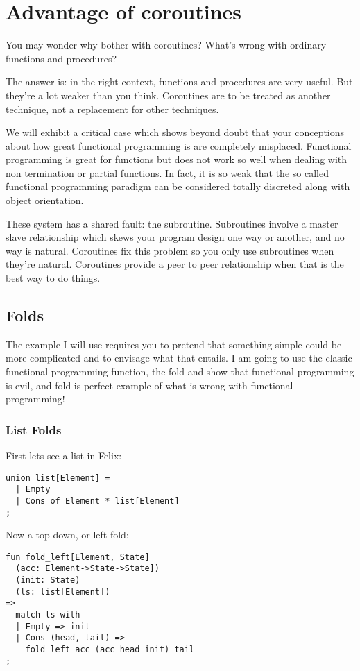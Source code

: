 \documentclass[oneside]{book}
\begin{document}
\chapter{Advantage of coroutines}
You may wonder why bother with coroutines? What's wrong with
ordinary functions and procedures?

The answer is: in the right context, functions and procedures
are very useful. But they're a lot weaker than you think.
Coroutines are to be treated as another technique, not a replacement
for other techniques.

We will exhibit a critical case which shows beyond doubt
that your conceptions about how great functional programming
is are completely misplaced. Functional programming is great for
functions but does not work so well when dealing with non termination
or partial functions. In fact, it is so weak that the so called
functional programming paradigm can be considered totally discreted
along with object orientation.

These system has a shared fault: the subroutine. Subroutines involve
a master slave relationship which skews your program design one
way or another, and no way is natural. Coroutines fix this problem
so you only use subroutines when they're natural. Coroutines provide
a peer to peer relationship when that is the best way to do things.

\section{Folds}
The example I will use requires you to pretend that something simple
could be more complicated and to envisage what that entails. 
I am going to use the classic functional programming function,
the fold and show that functional programming is evil, and fold is 
perfect example of what is wrong with functional programming!

\subsection{List Folds}
First lets see a list in Felix:

\begin{verbatim}
union list[Element] =
  | Empty 
  | Cons of Element * list[Element]
;
\end{verbatim}

Now a top down, or left fold:

\begin{verbatim}
fun fold_left[Element, State] 
  (acc: Element->State->State])
  (init: State)
  (ls: list[Element])
=>
  match ls with
  | Empty => init
  | Cons (head, tail) =>
    fold_left acc (acc head init) tail
;
\end{verbatim}
\end{document}
